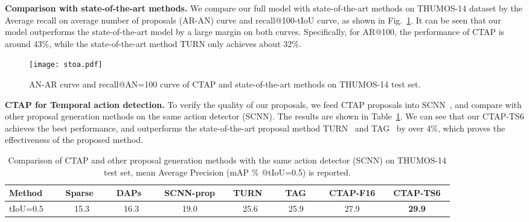 \documentclass[runningheads]{llncs}
\begin{document}
\textbf{Comparison with state-of-the-art methods.} We compare our full model with state-of-the-art methods on THUMOS-14 dataset by the Average recall on average number of proposals (AR-AN) curve and recall@100-tIoU curve, as shown in Fig.~\ref{fig: stoa}. It can be seen that our model outperforms the state-of-the-art model by a large margin on both curves. Specifically, for AR@100, the performance of CTAP is around 43\%, while the state-of-the-art method TURN \cite{Gao_2017_ICCV} only achieves about 32\%.

\begin{figure}[t]
  \centering
    \texttt{[image: stoa.pdf]}
    \caption{AN-AR curve and recall@AN=100 curve of CTAP and state-of-the-art methods on THUMOS-14 test set.}
      \label{fig: stoa}
\end{figure}

\textbf{CTAP for Temporal action detection.} To verify the quality of our proposals, we feed CTAP proposals into SCNN~\cite{Shou_2016_CVPR}, and compare with other proposal generation methods on the same action detector (SCNN). The results are shown in Table~\ref{tbl: detection}. We can see that our CTAP-TS6 achieves the best performance, and outperforms the state-of-the-art proposal method TURN~\cite{Gao_2017_ICCV} and TAG~\cite{Zhao_2017_ICCV} by over 4\%, which proves the effectiveness of the proposed method. 

\begin{table}[t]\scriptsize
\centering
\caption{Comparison of CTAP and other proposal generation methods with the same action detector (SCNN) on THUMOS-14 test set, mean Average Precision (mAP \% @tIoU=0.5) is reported. }
\label{tbl: detection}
\begin{tabular}{l|*5c|cc}
\toprule
 Method\ \ &\ Sparse~\cite{Heilbron_2016_CVPR}\ &\ DAPs~\cite{escorcia2016daps}\ &\ SCNN-prop\cite{Shou_2016_CVPR}\ &\ TURN~\cite{Gao_2017_ICCV}\ &\ TAG\cite{Zhao_2017_ICCV}\ \ &\ CTAP-F16\ &\ CTAP-TS6\ \\ \midrule
tIoU=0.5\ \ &\ 15.3\ &\ 16.3\ &\ 19.0\ &\ 25.6\ &\ 25.9\ \ &\ 27.9\ &\ \textbf{29.9}\ \\ \bottomrule
\end{tabular}
\end{table}
\end{document}
